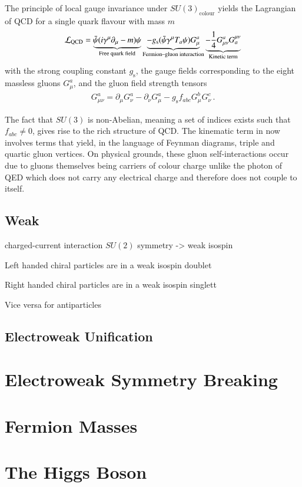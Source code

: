 The principle of local gauge invariance under $SU(3)_{\text{colour}}$ yields the
Lagrangian of QCD for a single quark flavour with mass $m$
\begin{align}
  \mathcal{L}_{\text{QCD}} =
  \underbrace{\bar{\psi} (i \gamma^\mu \partial_\mu - m) \psi}_{\text{Free quark field}}
  \underbrace{- g_{\text{s}} (\bar{\psi} \gamma^\mu T_a \psi) G_\mu^a}_{\text{Fermion--gluon interaction}}
  \underbrace{- \frac{1}{4} G_{\mu\nu}^a G^{\mu\nu}_a}_{\text{Kinetic term}}
  \label{eq:qcd_lagrangian}
\end{align}
with the strong coupling constant $g_{\text{s}}$, the gauge fields corresponding
to the eight massless gluons $G_\mu^a$, and the gluon field strength tensors
\begin{align*}
  G_{\mu\nu}^a = \partial_\mu G_\nu^a - \partial_\nu G_\mu^a - g_{\text{s}}
  f_{abc} G_\mu^b G_\nu^c \,\text{.}
\end{align*}

The fact that $SU(3)$ is non-Abelian, meaning a set of indices exists such that
$f_{abc} \neq 0$, gives rise to the rich structure of QCD. The kinematic term in
 now involves terms that yield, in the language of
Feynman diagrams, triple and quartic gluon vertices. On physical grounds, these
gluon self-interactions occur due to gluons themselves being carriers of colour
charge unlike the photon of QED which does not carry any electrical charge and
therefore does not couple to itself.


\subsection{Weak}

charged-current interaction $SU(2)$ symmetry -> weak isospin

Left handed chiral particles are in a weak isospin doublet

Right handed chiral particles are in a weak isospin singlett

Vice versa for antiparticles


\subsection{Electroweak Unification}

\section{Electroweak Symmetry Breaking}

\section{Fermion Masses}

\section{The Higgs Boson}


\clearpage

